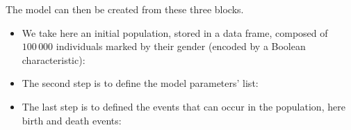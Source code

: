 The model can then be created from these three blocks.

\begin{itemize}
\tightlist
\item
  We take here an initial population, stored in a data frame, composed of \(100\,000\) individuals marked by their gender (encoded by a Boolean characteristic):
\end{itemize}

\begin{Shaded}
\begin{Highlighting}[]
\NormalTok{(}\NormalTok{)}
\StringTok{ }\OperatorTok{$}
\end{Highlighting}
\end{Shaded}

\begin{itemize}
\tightlist
\item
  The second step is to define the model parameters' list:
\end{itemize}

\begin{Shaded}
\begin{Highlighting}[]
\StringTok{ }\NormalTok{(}\NormalTok{ =}\StringTok{ }\NormalTok{, }\NormalTok{ =}\StringTok{ }\NormalTok{, }\NormalTok{ =}\StringTok{ }\NormalTok{,}
               \NormalTok{ =}\StringTok{ }\NormalTok{(}\NormalTok{(}\NormalTok{,}\NormalTok{), }\NormalTok{(}\NormalTok{,}\NormalTok{,}\NormalTok{)))}
\end{Highlighting}
\end{Shaded}

\begin{itemize}
\tightlist
\item
  The last step is to defined the events that can occur in the population, here birth and death events:
\end{itemize}

\begin{Shaded}
\begin{Highlighting}[]
\StringTok{ }\NormalTok{(} \NormalTok{,}
                   \NormalTok{)}

\StringTok{ }\NormalTok{(} \NormalTok{, }
                   \NormalTok{,}
                   \NormalTok{)}
\end{Highlighting}
\end{Shaded}

